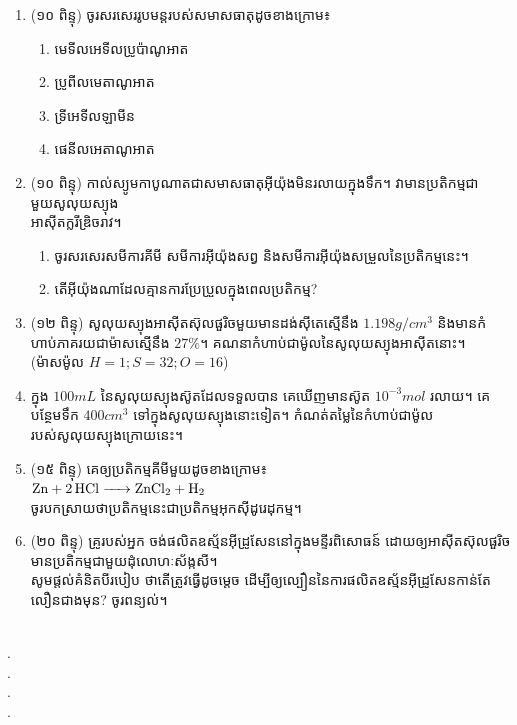 \documentclass{officialexam}
\begin{document}
\begin{enumerate}[I]
	\item  {\color{khtug}(១០ ពិន្ទុ)} ចូរសរសេររូបមន្តរបស់សមាសធាតុដូចខាងក្រោម៖
	\begin{enumerate}[k,2]
		\item មេទីលអេទីលប្រូប៉ាណូអាត
		\item ប្រូពីលមេតាណូអាត
		\item ទ្រីអេទីលឡាមីន
		\item ផេនីលអេតាណូអាត
	\end{enumerate}
	\item {\color{khtug}(១០ ពិន្ទុ)} កាល់ស្យូមកាបូណាតជាសមាសធាតុអុីយ៉ុងមិនរលាយក្នុងទឹក។ វាមានប្រតិកម្មជាមួយសូលុយស្យុង\\អាស៊ីតក្លរីឌ្រិចរាវ។
	\begin{enumerate}[k]
		\item ចូរសរសេរសមីការគីមី សមីការអុីយ៉ុងសព្វ និងសមីការអុីយ៉ុងសម្រួលនៃប្រតិកម្មនេះ។
		\item តើអុីយ៉ុងណាដែលគ្មានការប្រែប្រួលក្នុងពេលប្រតិកម្ម?
	\end{enumerate}
	\item {\color{khtug}(១២ ពិន្ទុ)} សូលុយស្យុងអាសុីតស៊ុលផួរិចមួយមានដង់សុីតេស្មើនឹង $1.198g/cm^3$ និងមានកំហាប់ភាគរយជាម៉ាសស្មើនឹង $27\%$។ គណនាកំហាប់ជាម៉ូលនៃសូលុយស្យុងអាសុីតនោះ។\\
	(ម៉ាសម៉ូល $H=1; S=32; O=16$)
	\item ក្នុង $100mL$ នៃសូលុយស្យុងស៊ូតដែលទទួលបាន គេឃើញមានស៊ូត $10^{-3} mol$ រលាយ។ គេបន្ថែមទឹក $400cm^3$ ទៅក្នុងសូលុយស្យុងនោះទៀត។ កំណត់តម្លៃនៃកំហាប់ជាម៉ូល របស់សូលុយស្យុងក្រោយនេះ។
	\item {\color{khtug}(១៥ ពិន្ទុ)} គេឲ្យប្រតិកម្មគីមីមួយដូចខាងក្រោម៖\\
	$\ce{Zn + 2HCl -> ZnCl2 + H2}$​\\
	 ចូរបកស្រាយថាប្រតិកម្មនេះជាប្រតិកម្មអុកស៊ីដូរេដុកម្ម។
	\item {\color{khtug}(២០ ពិន្ទុ)} គ្រូរបស់អ្នក ចង់ផលិតឧស្ម័នអុីដ្រូសែននៅក្នុងមន្ទីរពិសោធន៍ ដោយឲ្យអាសុីតស៊ុលផួរិចមានប្រតិកម្មជាមួយដុំលោហៈស័ង្កសី។\\ សូមផ្តល់គំនិតបីរបៀប ថាតើត្រូវធ្វើដូចម្តេច ដើម្បីឲ្យល្បឿននៃការផលិតឧស្ម័នអុីដ្រូសែនកាន់តែលឿនជាងមុន? ចូរពន្យល់។
\end{enumerate}
\\
{\color{white}.}\dotfill\\
{\color{white}.}\dotfill\\
{\color{white}.}\dotfill
\\
{\color{white}.}\dotfill\\
\end{document}
